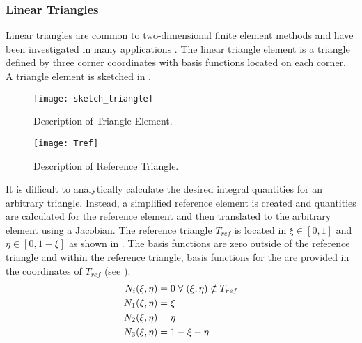     \subsubsection{Linear Triangles}
      Linear triangles are common to two-dimensional finite element methods and
      have been investigated in many applications \cite{Hosseini2017} 
      \cite{Hosseini2013} \cite{Hosseini2015}. The linear triangle element is a
      triangle  defined by three corner coordinates with basis functions located 
      on each corner. A triangle element is sketched in 
      .
      \begin{figure}
        \centering
        \texttt{[image: sketch\_triangle]}
        \caption{Description of Triangle Element.}
        \label{fig:sketch_triangle}
      \end{figure}
      \begin{figure}
        \centering
        \texttt{[image: Tref]}
        \caption{Description of Reference Triangle.}
        \label{fig:Tref}
      \end{figure}
      It is difficult to analytically calculate the desired integral quantities
      for an arbitrary triangle. Instead, a simplified reference element is
      created and quantities are calculated for the reference element and then
      translated to the arbitrary element using a Jacobian. 
      The reference triangle $T_{ref}$ is located in
      $\xi \in [0,1]$ and $\eta \in [0,1-\xi]$ as shown in . The
      basis functions are zero outside of the reference triangle and within the
      reference triangle, basis functions for the are provided in the
      coordinates of $T_{ref}$ (see ).
      \begin{align}
        N_i(\xi,\eta) &= 0 \; \forall \; (\xi,\eta) \notin T_{ref} \\
        N_1(\xi,\eta) &= \xi \\
        N_2(\xi,\eta) &= \eta \\
        N_3(\xi,\eta) &= 1-\xi-\eta
      \end{align}
      

